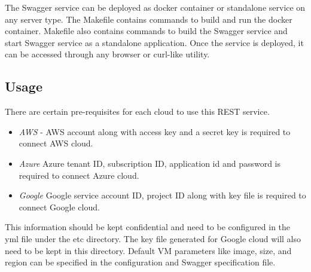 The Swagger service can be deployed as docker container or
standalone service on any server type. The Makefile contains commands to 
build and run the docker container. Makefile also contains commands to build the Swagger service and start Swagger service as a standalone application. Once the service is deployed, it can be accessed through any browser or curl-like utility.


\subsection{Usage}

There are certain pre-requisites for each cloud to use
this REST service.
\begin{itemize}
\item \emph{AWS} - AWS account along with access key and a secret key is required to connect AWS cloud.
\item \emph{Azure}
Azure tenant ID, subscription ID, application id and password is required to connect Azure cloud.
\item \emph{Google}
Google service account ID, project ID along with key file is required to connect Google cloud.
\end{itemize}
This information should be kept confidential and need to be configured in the yml file under the etc directory. The key file generated for Google cloud will also need to be kept in this directory. Default VM parameters like image, size, and region can be specified in the configuration and Swagger specification file.

